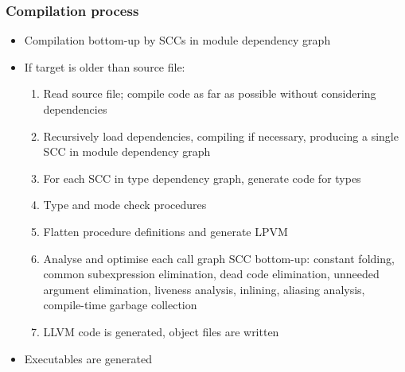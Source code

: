 \documentclass[12pt]{beamer}
\begin{document}
\begin{frame}[fragile]
\frametitle{Compilation process}
\begin{itemize}
\item Compilation bottom-up by SCCs in module dependency graph
\item If target is older than source file:
\begin{enumerate}
\item Read source file; compile code as far as possible without
  considering dependencies
\item Recursively load dependencies, compiling if necessary,
  producing a single SCC in module dependency graph
\item For each SCC in type dependency graph, generate code for types
\item Type and mode check procedures
\item Flatten procedure definitions and generate LPVM
\item Analyse and optimise each call graph SCC bottom-up:
  constant folding,
  common subexpression elimination, dead code elimination, unneeded
  argument elimination, liveness analysis, inlining,
  aliasing analysis, compile-time garbage collection
\item LLVM code is generated, object files are written
\end{enumerate}
\item Executables are generated
\end{itemize}
\end{frame}
\end{document}
